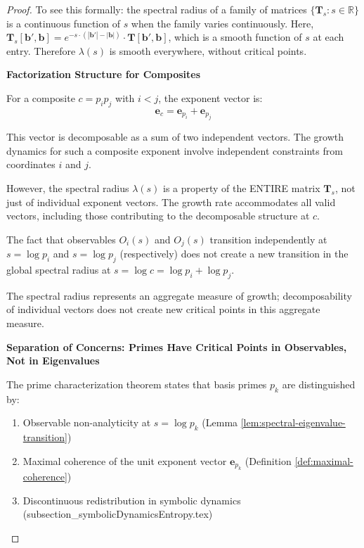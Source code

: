 \begin{proof}
To see this formally: the spectral radius of a family of matrices $\{\mathbf{T}_s : s \in \mathbb{R}\}$ is a continuous function of $s$ when the family varies continuously. Here, $\mathbf{T}_s[\mathbf{b}', \mathbf{b}] = e^{-s \cdot (|\mathbf{b}'| - |\mathbf{b}|)} \cdot \mathbf{T}[\mathbf{b}', \mathbf{b}]$, which is a smooth function of $s$ at each entry. Therefore $\lambda(s)$ is smooth everywhere, without critical points.

\noindent \textbf{Factorization Structure for Composites}

For a composite $c = p_i p_j$ with $i < j$, the exponent vector is:
\begin{equation}
\mathbf{e}_c = \mathbf{e}_{p_i} + \mathbf{e}_{p_j}
\end{equation}

This vector is decomposable as a sum of two independent vectors. The growth dynamics for such a composite exponent involve independent constraints from coordinates $i$ and $j$.

However, the spectral radius $\lambda(s)$ is a property of the ENTIRE matrix $\mathbf{T}_s$, not just of individual exponent vectors. The growth rate accommodates all valid vectors, including those contributing to the decomposable structure at $c$.

The fact that observables $O_i(s)$ and $O_j(s)$ transition independently at $s = \log p_i$ and $s = \log p_j$ (respectively) does not create a new transition in the global spectral radius at $s = \log c = \log p_i + \log p_j$.

The spectral radius represents an aggregate measure of growth; decomposability of individual vectors does not create new critical points in this aggregate measure.

\noindent \textbf{Separation of Concerns: Primes Have Critical Points in Observables, Not in Eigenvalues}

The prime characterization theorem states that basis primes $p_k$ are distinguished by:
\begin{enumerate}
\item Observable non-analyticity at $s = \log p_k$ (Lemma \ref{lem:spectral-eigenvalue-transition})
\item Maximal coherence of the unit exponent vector $\mathbf{e}_{p_k}$ (Definition \ref{def:maximal-coherence})
\item Discontinuous redistribution in symbolic dynamics (subsection_symbolicDynamicsEntropy.tex)
\end{enumerate}


\end{proof}
